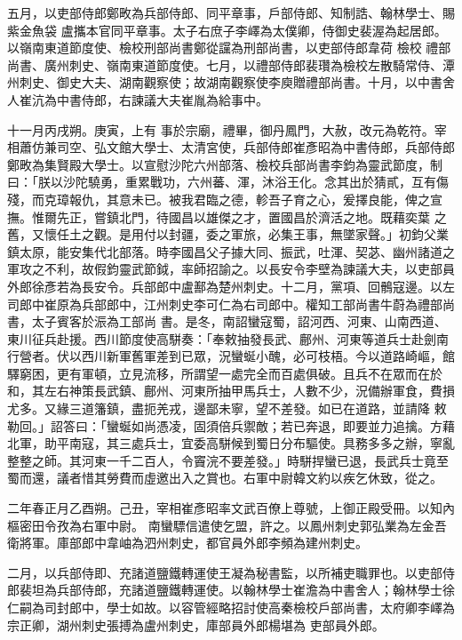 \begin{pinyinscope}
 五月，以吏部侍郎鄭畋為兵部侍郎、同平章事，戶部侍郎、知制誥、翰林學士、賜紫金魚袋
 盧攜本官同平章事。太子右庶子李嶧為太僕卿，侍御史裴渥為起居郎。以嶺南東道節度使、檢校刑部尚書鄭從讜為刑部尚書，以吏部侍郎韋荷
 檢校
 禮部尚書、廣州刺史、嶺南東道節度使。七月，以禮部侍郎裴瓚為檢校左散騎常侍、潭州刺史、御史大夫、湖南觀察使；故湖南觀察使李庾贈禮部尚書。十月，以中書舍人崔沆為中書侍郎，右諫議大夫崔胤為給事中。



 十一月丙戌朔。庚寅，上有
 事於宗廟，禮畢，御丹鳳門，大赦，改元為乾符。宰相蕭仿兼司空、弘文館大學士、太清宮使，兵部侍郎崔彥昭為中書侍郎，兵部侍郎鄭畋為集賢殿大學士。以宣慰沙陀六州部落、檢校兵部尚書李鈞為靈武節度，制曰：「朕以沙陀驍勇，重累戰功，六州蕃、渾，沐浴王化。念其出於猜貳，互有傷殘，而克璋報仇，其意未已。被我君臨之德，軫吾子育之心，爰擇良能，俾之宣撫。惟爾先正，嘗鎮北門，待國昌以雄傑之才，置國昌於濟活之地。既藉奕葉
 之舊，又懷任土之觀。是用付以封疆，委之軍旅，必集王事，無墜家聲。」初鈞父業鎮太原，能安集代北部落。時李國昌父子據大同、振武，吐渾、契苾、幽州諸道之軍攻之不利，故假鈞靈武節鉞，率師招諭之。以長安令李壁為諫議大夫，以吏部員外郎徐彥若為長安令。兵部郎中盧鄯為楚州刺史。十二月，黨項、回鶻寇邊。以左司郎中崔原為兵部郎中，江州刺史李可仁為右司郎中。權知工部尚書牛蔚為禮部尚書，太子賓客於浱為工部尚
 書。是冬，南詔蠻寇蜀，詔河西、河東、山南西道、東川征兵赴援。西川節度使高駢奏：「奉敕抽發長武、鄜州、河東等道兵士赴劍南行營者。伏以西川新軍舊軍差到已眾，況蠻蜒小醜，必可枝梧。今以道路崎嶇，館驛窮困，更有軍頓，立見流移，所謂望一處完全而百處俱破。且兵不在眾而在於和，其左右神策長武鎮、鄜州、河東所抽甲馬兵士，人數不少，況備辦軍食，費損尤多。又緣三道籓鎮，盡扼羌戎，邊鄙未寧，望不差發。如已在道路，並請降
 敕勒回。」詔答曰：「蠻蜒如尚憑凌，固須倍兵禦敵；若已奔退，即要並力追擒。方藉北軍，助平南寇，其三處兵士，宜委高駢候到蜀日分布驅使。具務多多之辦，寧亂整整之師。其河東一千二百人，令竇浣不要差發。」時駢捍蠻已退，長武兵士竟至蜀而還，議者惜其勞費而虛邀出入之賞也。右軍中尉韓文約以疾乞休致，從之。



 二年春正月乙酉朔。己丑，宰相崔彥昭率文武百僚上尊號，上御正殿受冊。以知內樞密田令孜為右軍中尉。
 南蠻驃信遣使乞盟，許之。以鳳州刺史郭弘業為左金吾衛將軍。庫部郎中韋岫為泗州刺史，都官員外郎李頻為建州刺史。



 二月，以兵部侍即、充諸道鹽鐵轉運使王凝為秘書監，以所補吏職罪也。以吏部侍郎裴坦為兵部侍郎，充諸道鹽鐵轉運使。以翰林學士崔澹為中書舍人；翰林學士徐仁嗣為司封郎中，學士如故。以容管經略招討使高秦檢校戶部尚書，太府卿李嶧為宗正卿，湖州刺史張搏為盧州刺史，庫部員外郎楊堪為
 吏部員外郎。




\end{pinyinscope}
